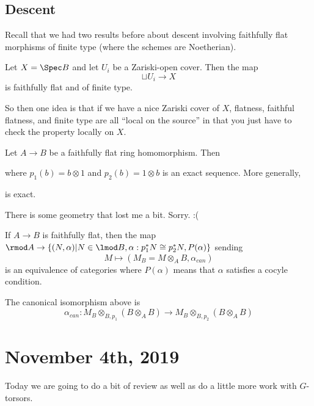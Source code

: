 \documentclass[12pt]{article}
\begin{document}
\subsection{Descent}
Recall that we had two results before about descent involving faithfully flat morphisms of finite type (where the schemes are Noetherian).

\begin{ex}Let $X=\Spec B$ and let $U_i$ be a Zariski-open cover. Then the map 
\[\sqcup U_i\to X\]
is faithfully flat and of finite type.
\end{ex}
So then one idea is that if we have a nice Zariski cover of $X$, flatness, faithful flatness, and finite type are all ``local on the source''
in that you just have to check the property locally on $X$.

\brk

\begin{prop}
	Let $A\to B$ be a faithfully flat ring homomorphism. Then 
	\begin{center}
	\end{center}
	where $p_1(b)=b\otimes 1$ and $p_2(b)=1\otimes b$ is an exact sequence. More generally, 
	\begin{center}
	\end{center}
	is exact.
\end{prop}

There is some geometry that lost me a bit. Sorry. :(
\begin{prop}
	If $A\to B$ is faithfully flat, then the map $\rmod A\to\{(N,\alpha)|N\in\lmod B, \alpha:p_1^\ast N\cong p_2^\ast N, P(\alpha)\}$ 
	sending
	\[M\mapsto(M_B=M\otimes_AB,\alpha_{can})\]
	is 
	an equivalence of categories where $P(\alpha)$ means that $\alpha$ satisfies a cocyle condition. 
\end{prop}
\begin{rmk}
	The canonical isomorphism above is 
	\[\alpha_{can}:M_B\otimes_{B,p_1}(B\otimes_AB)\to M_B\otimes_{B,p_2}(B\otimes_A B)\]
\end{rmk}

\section{November 4th, 2019}
Today we are going to do a bit of review as well as do a little more work with $G$-torsors.
\end{document}

